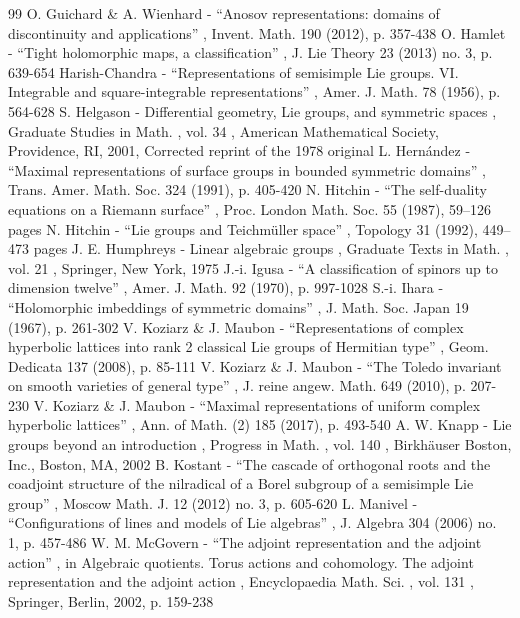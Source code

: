 \begin{thebibliography}{99}
 O. Guichard \& A. Wienhard - “Anosov representations: domains of discontinuity and applications” , Invent. Math. 190 (2012), p. 357-438
 O. Hamlet - “Tight holomorphic maps, a classification” , J. Lie Theory 23 (2013) no. 3, p. 639-654
 Harish-Chandra - “Representations of semisimple Lie groups. VI. Integrable and square-integrable representations” , Amer. J. Math. 78 (1956), p. 564-628
 S. Helgason - Differential geometry, Lie groups, and symmetric spaces , Graduate Studies in Math. , vol. 34 , American Mathematical Society, Providence, RI, 2001, Corrected reprint of the 1978 original
 L. Hernández - “Maximal representations of surface groups in bounded symmetric domains” , Trans. Amer. Math. Soc. 324 (1991), p. 405-420
 N. Hitchin - “The self-duality equations on a Riemann surface” , Proc. London Math. Soc. 55 (1987), 59–126 pages
 N. Hitchin - “Lie groups and Teichmüller space” , Topology 31 (1992), 449–473 pages
 J. E. Humphreys - Linear algebraic groups , Graduate Texts in Math. , vol. 21 , Springer, New York, 1975
 J.-i. Igusa - “A classification of spinors up to dimension twelve” , Amer. J. Math. 92 (1970), p. 997-1028
 S.-i. Ihara - “Holomorphic imbeddings of symmetric domains” , J. Math. Soc. Japan 19 (1967), p. 261-302
 V. Koziarz \& J. Maubon - “Representations of complex hyperbolic lattices into rank 2 classical Lie groups of Hermitian type” , Geom. Dedicata 137 (2008), p. 85-111
 V. Koziarz \& J. Maubon - “The Toledo invariant on smooth varieties of general type” , J. reine angew. Math. 649 (2010), p. 207-230
 V. Koziarz \& J. Maubon - “Maximal representations of uniform complex hyperbolic lattices” , Ann. of Math. (2) 185 (2017), p. 493-540
 A. W. Knapp - Lie groups beyond an introduction , Progress in Math. , vol. 140 , Birkhäuser Boston, Inc., Boston, MA, 2002
 B. Kostant - “The cascade of orthogonal roots and the coadjoint structure of the nilradical of a Borel subgroup of a semisimple Lie group” , Moscow Math. J. 12 (2012) no. 3, p. 605-620
 L. Manivel - “Configurations of lines and models of Lie algebras” , J. Algebra 304 (2006) no. 1, p. 457-486
 W. M. McGovern - “The adjoint representation and the adjoint action” , in Algebraic quotients. Torus actions and cohomology. The adjoint representation and the adjoint action , Encyclopaedia Math. Sci. , vol. 131 , Springer, Berlin, 2002, p. 159-238

\end{thebibliography}
